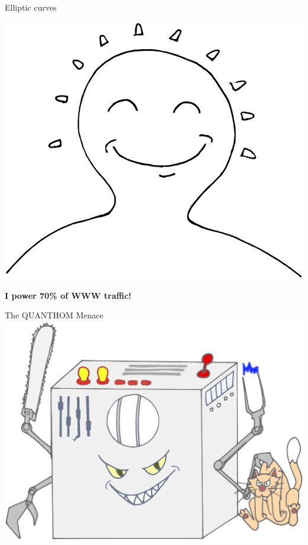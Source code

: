 \documentclass{beamer}
\begin{document}
\begin{frame}{Elliptic curves}
  \transdissolve
  \centering

  \bigskip
  
  \includegraphics[height=0.7\textheight]{ec-happy}

  \Large\bf I power 70\% of WWW traffic!
\end{frame}


\begin{frame}{The QUANTHOM Menace}
  \centering
  \includegraphics[height=0.7\textheight]{qc-color}
\end{frame}
\end{document}
